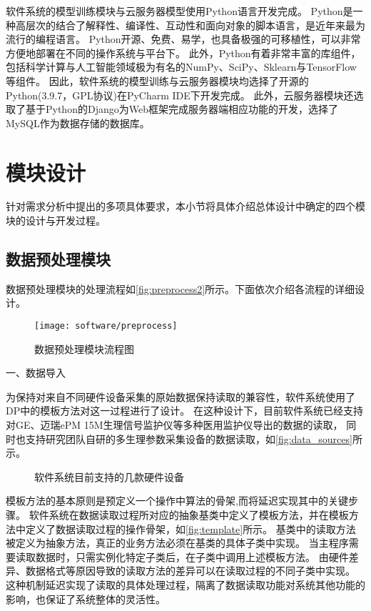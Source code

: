 软件系统的模型训练模块与云服务器模型使用Python语言开发完成。
Python是一种高层次的结合了解释性、编译性、互动性和面向对象的脚本语言，是近年来最为流行的编程语言。
Python开源、免费、易学，也具备极强的可移植性，可以非常方便地部署在不同的操作系统与平台下。
此外，Python有着非常丰富的库组件，包括科学计算与人工智能领域极为有名的NumPy、SciPy、Sklearn与TensorFlow等组件。
因此，软件系统的模型训练与云服务器模块均选择了开源的Python(3.9.7，GPL协议)在PyCharm IDE下开发完成。
此外，云服务器模块还选取了基于Python的Django为Web框架完成服务器端相应功能的开发，选择了MySQL作为数据存储的数据库。

\section{模块设计}

针对需求分析中提出的多项具体要求，本小节将具体介绍总体设计中确定的四个模块的设计与开发过程。
\subsection{数据预处理模块}

数据预处理模块的处理流程如\autoref{fig:preprocess2}所示。下面依次介绍各流程的详细设计。
\begin{figure}[htbp]
    \centering
    \texttt{[image: software/preprocess]}
    \caption{\label{fig:preprocess2}数据预处理模块流程图}
\end{figure}

一、数据导入

为保持对来自不同硬件设备采集的原始数据保持读取的兼容性，软件系统使用了DP中的模板方法对这一过程进行了设计。
在这种设计下，目前软件系统已经支持对GE、迈瑞ePM 15M生理信号监护仪等多种医用监护仪导出的数据的读取，
同时也支持研究团队自研的多生理参数采集设备的数据读取，如\autoref{fig:data_sources}所示。

\begin{figure}[htbp]
    \centering
    \quad
    \quad
    \caption{\label{fig:data_sources}软件系统目前支持的几款硬件设备}
\end{figure}

模板方法的基本原则是预定义一个操作中算法的骨架,而将延迟实现其中的关键步骤。
软件系统在数据读取过程所对应的抽象基类中定义了模板方法，并在模板方法中定义了数据读取过程的操作骨架，如\autoref{fig:template}所示。
基类中的读取方法被定义为抽象方法，真正的业务方法必须在基类的具体子类中实现。
当主程序需要读取数据时，只需实例化特定子类后，在子类中调用上述模板方法。
由硬件差异、数据格式等原因导致的读取方法的差异可以在读取过程的不同子类中实现。
这种机制延迟实现了读取的具体处理过程，隔离了数据读取功能对系统其他功能的影响，也保证了系统整体的灵活性。

